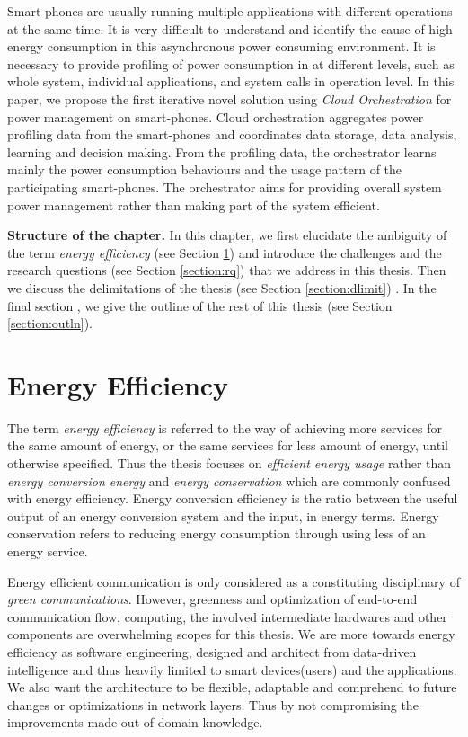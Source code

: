 Smart-phones are usually running multiple applications with different operations at the same time. It is very difficult to understand and identify the cause of high energy consumption in this asynchronous power consuming environment. It is necessary to provide profiling of power consumption in at different levels, such as whole system, individual applications, and system calls in operation level. In this paper, we propose the first iterative novel solution using \textit{Cloud Orchestration} for power management on smart-phones. Cloud orchestration aggregates power profiling data from the smart-phones and coordinates data storage, data analysis, learning and decision making. From the profiling data, the orchestrator learns mainly the power consumption behaviours and the usage pattern of the participating smart-phones. The orchestrator aims for providing overall system power management rather than making part of the system efficient. 

{\bf Structure of the chapter.} In this chapter, we first elucidate the ambiguity of the term \emph{energy efficiency} (see Section \ref{section:prob}) and introduce the challenges and the research questions (see Section \ref{section:rq}) that we address in this thesis. Then we discuss the delimitations of the thesis (see Section \ref{section:dlimit}) . In the final section , we give the outline of the rest of this thesis (see Section \ref{section:outln}). 
\section{Energy Efficiency}
\label{section:prob}
The term \emph{energy efficiency} is referred to the way of achieving more services for the same amount of energy, or the same services for less amount of energy, until otherwise specified. Thus the thesis focuses on \textit{efficient energy usage} rather than \textit{energy conversion energy} and \emph{energy conservation} which are commonly confused with energy efficiency. 
Energy conversion efficiency is the ratio between  the useful output of an energy conversion system and the input, in energy terms. Energy conservation refers to reducing energy consumption through using less of an energy service.

Energy efficient communication is only considered as a  constituting disciplinary of \emph{green communications}. However, greenness and optimization of end-to-end communication flow, computing,  the involved intermediate hardwares and other components are overwhelming scopes for this thesis.  We are more towards energy efficiency as software engineering, designed and architect  from data-driven intelligence and thus heavily limited to smart devices(users) and the applications. We also want the architecture to be flexible, adaptable and comprehend to future changes  or optimizations in network layers. Thus by not compromising the improvements made out of domain knowledge.\\
 

